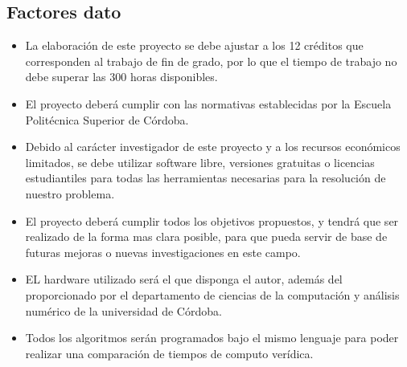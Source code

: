 \documentclass[a4paper,12pt,twoside,final]{book}
\begin{document}
\subsection{Factores dato}
\begin{itemize}

\item  La elaboración de este proyecto se debe ajustar a los 12 créditos que corresponden al trabajo de fin de grado, por lo que el tiempo de trabajo no debe superar las 300 horas disponibles.

\item El proyecto deberá cumplir con las normativas establecidas por la Escuela Politécnica Superior de Córdoba.

\item Debido al carácter investigador de este proyecto y a los recursos económicos limitados, se debe utilizar software libre, versiones gratuitas o licencias estudiantiles para todas las herramientas necesarias para la resolución de nuestro problema.

\item El proyecto deberá cumplir todos los objetivos propuestos, y tendrá que ser realizado de la forma mas clara posible, para que pueda servir de base de futuras mejoras o nuevas investigaciones en este campo.

\item EL hardware utilizado será el que disponga el autor, además del proporcionado por el departamento de ciencias de la computación y análisis numérico de la universidad de Córdoba.

\item Todos los algoritmos serán programados bajo el mismo lenguaje para poder realizar una comparación de tiempos de computo verídica.

\end{itemize}

\newpage
\end{document}
